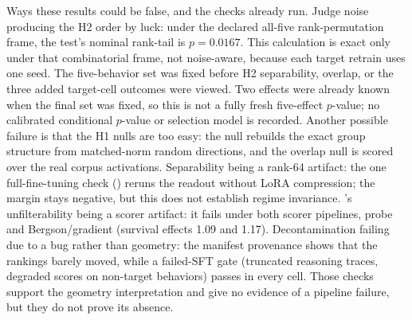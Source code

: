Ways these results could be false, and the checks already run. Judge noise
producing the H2 order by luck: under the declared all-five rank-permutation
frame, the test's nominal rank-tail is $p = 0.0167$. This calculation is exact
only under that combinatorial frame, not noise-aware, because each target
retrain uses one seed. The five-behavior set was fixed before H2 separability,
overlap, or the three added target-cell outcomes were viewed. Two effects
were already known when the final set was fixed, so this is not a fully fresh
five-effect $p$-value; no calibrated conditional $p$-value or selection model
is recorded. Another possible failure is that the H1 nulls are too easy: the
null rebuilds the exact group structure from matched-norm random directions,
and the overlap null is scored over the
real corpus activations. Separability being a rank-64 artifact: the one
full-fine-tuning check () reruns the readout
without LoRA compression; the margin stays negative, but this does not
establish regime invariance. 's unfilterability being
a scorer artifact: it fails under both scorer pipelines, probe and
Bergson/gradient (survival effects 1.09 and 1.17). Decontamination failing
due to a bug rather than geometry: the manifest provenance shows that the
rankings barely moved, while a failed-SFT gate (truncated reasoning traces,
degraded scores on non-target behaviors) passes in every cell. Those checks
support the geometry interpretation and give no evidence of a pipeline
failure, but they do not prove its absence.
